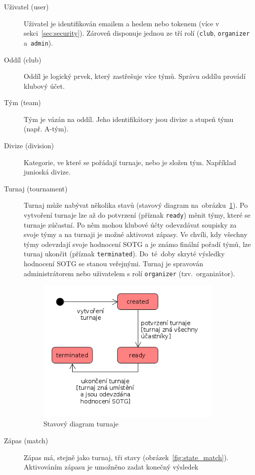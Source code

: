 \begin{description}
  \item[Uživatel (user)]
  Uživatel je identifikován emailem a heslem nebo tokenem (více v sekci~\ref{sec:security}).
  Zároveň disponuje jednou ze tří rolí (\texttt{club}, \texttt{organizer} a~\texttt{admin}).
  \item[Oddíl (club)]
  Oddíl je logický prvek, který zastřešuje více týmů. Správu oddílu provádí klubový účet.
  \item[Tým (team)]
  Tým je vázán na oddíl. Jeho identifikátory jsou divize a stupeň týmu (např. A-tým).
  \item[Divize (division)]
  Kategorie, ve které se pořádají turnaje, nebo je složen tým. Například junioská divize. %
  \item[Turnaj (tournament)]
    Turnaj může nabývat několika stavů (stavový diagram na~obrázku~\ref{fig:state_tournament}).
    Po vytvoření turnaje lze až do potvrzení (příznak \texttt{ready}) měnit týmy, které se turnaje zúčastní.
    Po něm mohou klubové účty odevzdávat soupisky za svoje týmy a na turnaji je možné aktivovat zápasy. Ve chvíli,
    kdy všechny týmy odevzdají svoje hodnocení SOTG a je známo finální pořadí týmů,
    lze turnaj ukončit (příznak \texttt{terminated}). Do~té~doby skryté výsledky hodnocení SOTG se stanou veřejnými.
    Turnaj je spravován administrátorem nebo uživatelem s rolí \texttt{organizer} (tzv.~organizátor).
    \begin{figure}[ht!]
      \centering
      \includegraphics[width=90mm]{./images/stavovy-diagram-turnaj.png}
      \caption{Stavový diagram turnaje\label{overflow}}
      \label{fig:state_tournament}
    \end{figure}
  \item[Zápas (match)]
    Zápas má, stejně jako turnaj, tři stavy (obrázek~\ref{fig:state_match}). Aktivováním zápasu je umožněno zadat konečný výsledek

\end{description}
